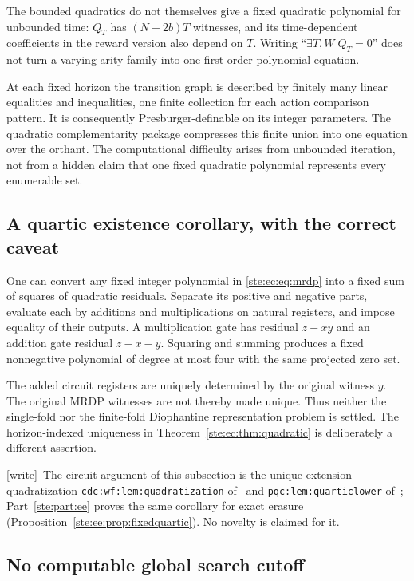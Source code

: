\documentclass[11pt,letterpaper]{article}
\theoremstyle{definition}
\theoremstyle{remark}
\newcommand{\wtag}{\textup{[write]}}
\begin{document}
The bounded quadratics do not themselves give a fixed quadratic polynomial
for unbounded time: $Q_T$ has $(N+2b)T$ witnesses, and its time-dependent
coefficients in the reward version also depend on $T$. Writing
``$\exists T,W\;Q_T=0$'' does not turn a varying-arity family into one
first-order polynomial equation.

At each fixed horizon the transition graph is described by finitely many
linear equalities and inequalities, one finite collection for each action
comparison pattern. It is consequently Presburger-definable on its integer
parameters. The quadratic complementarity package compresses this finite
union into one equation over the orthant. The computational difficulty
arises from unbounded iteration, not from a hidden claim that one fixed
quadratic polynomial represents every enumerable set.

\subsection{A quartic existence corollary, with the correct caveat}

One can convert any fixed integer polynomial in \eqref{ste:ec:eq:mrdp} into a
fixed sum of squares of quadratic residuals. Separate its positive and
negative parts, evaluate each by additions and multiplications on natural
registers, and impose equality of their outputs. A multiplication gate
has residual $z-xy$ and an addition gate residual $z-x-y$. Squaring and
summing produces a fixed nonnegative polynomial of degree at most four
with the same projected zero set.

The added circuit registers are uniquely determined by the original
witness $y$. The original MRDP witnesses are not thereby made unique.
Thus neither the single-fold nor the finite-fold Diophantine representation
problem is settled. The horizon-indexed uniqueness in
Theorem~\ref{ste:ec:thm:quadratic} is deliberately a different assertion.

\wtag\ The circuit argument of this subsection is the unique-extension quadratization \texttt{cdc:wf:lem:quadratization} of~\cite{cdc} and \texttt{pqc:lem:quarticlower} of~\cite{pqc}; Part~\ref{ste:part:ee} proves the same corollary for exact erasure (Proposition~\ref{ste:ee:prop:fixedquartic}). No novelty is claimed for it.

\subsection{No computable global search cutoff}
\end{document}
